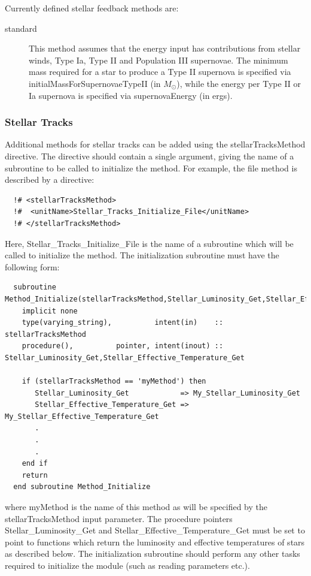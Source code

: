 Currently defined stellar feedback methods are:
\begin{description}
 \item [{\normalfont \ttfamily standard}] This method assumes that the energy input has contributions from stellar winds, Type Ia, Type II and Population III supernovae. The minimum mass required for a star to produce a Type II supernova is specified via {\normalfont \ttfamily initialMassForSupernovaeTypeII} (in $M_\odot$), while the energy per Type II or Ia supernova is specified via {\normalfont \ttfamily supernovaEnergy} (in ergs).
\end{description}

\subsubsection{Stellar Tracks}

Additional methods for stellar tracks can be added using the {\normalfont \ttfamily stellarTracksMethod} directive. The directive should contain a single argument, giving the name of a subroutine to be called to initialize the method. For example, the {\normalfont \ttfamily file} method is described by a directive:
\begin{verbatim}
  !# <stellarTracksMethod>
  !#  <unitName>Stellar_Tracks_Initialize_File</unitName>
  !# </stellarTracksMethod>
\end{verbatim}
Here, {\normalfont \ttfamily Stellar\_Tracks\_Initialize\_File} is the name of a subroutine which will be called to initialize the method. The initialization subroutine must have the following form:
\begin{verbatim}
  subroutine Method_Initialize(stellarTracksMethod,Stellar_Luminosity_Get,Stellar_Effective_Temperature_Get)
    implicit none
    type(varying_string),          intent(in)    :: stellarTracksMethod
    procedure(),          pointer, intent(inout) :: Stellar_Luminosity_Get,Stellar_Effective_Temperature_Get
    
    if (stellarTracksMethod == 'myMethod') then
       Stellar_Luminosity_Get            => My_Stellar_Luminosity_Get
       Stellar_Effective_Temperature_Get => My_Stellar_Effective_Temperature_Get
       .
       .
       .
    end if
    return
  end subroutine Method_Initialize
\end{verbatim}
where {\normalfont \ttfamily myMethod} is the name of this method as will be specified by the {\normalfont \ttfamily stellarTracksMethod} input parameter. The procedure pointers {\normalfont \ttfamily Stellar\_Luminosity\_Get} and {\normalfont \ttfamily Stellar\_Effective\_Temperature\_Get} must be set to point to functions which return the luminosity and effective temperatures of stars as described below. The initialization subroutine should perform any other tasks required to initialize the module (such as reading parameters etc.).

